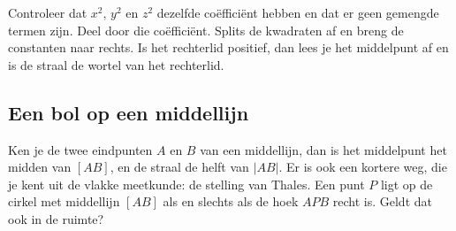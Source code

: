 
\begin{werkwijze}
Controleer dat $x^2$, $y^2$ en $z^2$ dezelfde coëfficiënt hebben en dat er geen gemengde termen zijn. Deel door die coëfficiënt. Splits de kwadraten af en breng de constanten naar rechts. Is het rechterlid positief, dan lees je het middelpunt af en is de straal de wortel van het rechterlid.
\end{werkwijze}


\begin{oefeningen}
\end{oefeningen}

\subsection{Een bol op een middellijn}

Ken je de twee eindpunten $A$ en $B$ van een middellijn, dan is het middelpunt het midden van $[AB]$, en de straal de helft van $|AB|$. Er is ook een kortere weg, die je kent uit de vlakke meetkunde: de stelling van Thales. Een punt $P$ ligt op de cirkel met middellijn $[AB]$ als en slechts als de hoek $APB$ recht is. Geldt dat ook in de ruimte?

